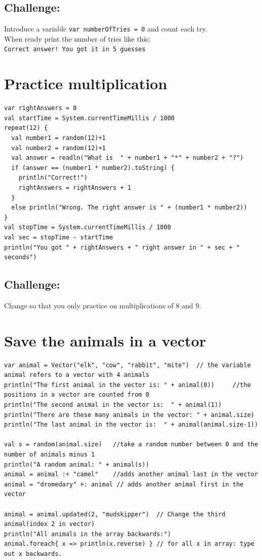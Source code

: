 \section*{\color{BrickRed}Challenge:}
Introduce a variable \lstinline{var numberOfTries = 0} and count each try.\\
When ready print the number of tries like this:\\
\lstinline{Correct answer! You got it in 5 guesses}
\chapter{Practice multiplication}
\begin{lstlisting}[basicstyle={\ttfamily\fontsize{16}{19}\selectfont},numbers=none]
var rightAnswers = 0
val startTime = System.currentTimeMillis / 1000
repeat(12) {
  val number1 = random(12)+1
  val number2 = random(12)+1
  val answer = readln("What is  " + number1 + "*" + number2 + "?")
  if (answer == (number1 * number2).toString) {
    println("Correct!")
    rightAnswers = rightAnswers + 1
  }
  else println("Wrong. The right answer is " + (number1 * number2))
}
val stopTime = System.currentTimeMillis / 1000
val sec = stopTime - startTime
println("You got " + rightAnswers + " right answer in " + sec + " seconds")
\end{lstlisting}
        
\section*{\color{BrickRed}Challenge:}
Change so that you only practice on multiplications of 8 and 9.
\chapter{Save the animals in a vector}
\begin{lstlisting}[basicstyle={\ttfamily\fontsize{14}{17}\selectfont},numbers=none]
var animal = Vector("elk", "cow", "rabbit", "mite")  // the variable animal refers to a vector with 4 animals
println("The first animal in the vector is: " + animal(0))     //the positions in a vector are counted from 0
println("The second animal in the vector is:  " + animal(1))
println("There are these many animals in the vector: " + animal.size)
println("The last animal in the vector is:  " + animal(animal.size-1))

val s = random(animal.size)   //take a random number between 0 and the number of animals minus 1
println("A random animal: " + animal(s))
animal = animal :+ "camel"    //adds another animal last in the vector
animal = "dromedary" +: animal // adds another animal first in the vector

animal = animal.updated(2, "mudskipper")  // Change the third animal(index 2 in vector)
println("All animals in the array backwards:")
animal.foreach{ x => println(x.reverse) } // for all x in array: type out x backwards.
\end{lstlisting}
        
